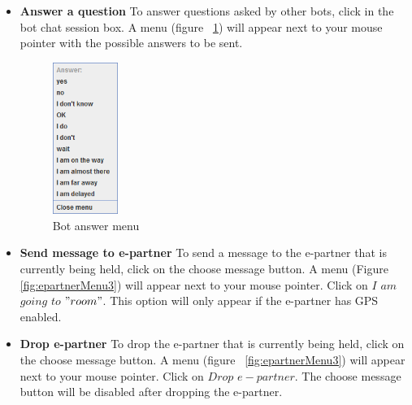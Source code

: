 \begin{itemize}
\item \textbf{Answer a question}
To answer questions asked by other bots, click in the bot chat session box. A menu (figure ~\ref{fig:answerBot}) will appear next to your mouse pointer with the possible answers to be sent.

\begin{figure}[h]
\begin{center}
\includegraphics[width=0.2\textwidth]{HumanPlayerGUI/hpg-bot-chat.png}
\end{center}
\caption{Bot answer menu}
\label{fig:answerBot}
\end{figure}

\item \textbf{Send message to e-partner}
To send a message to the e-partner that is currently being held, click on the choose message button. A menu (Figure  \ref{fig:epartnerMenu3}) will appear next to your mouse pointer. Click on $I$ $am$ $going$ $to$ $"room"$. This option will only appear if the e-partner has GPS enabled.

\item \textbf{Drop e-partner}
To drop the e-partner that is currently being held, click on the choose message button. A menu (figure  ~\ref{fig:epartnerMenu3}) will appear next to your mouse pointer. Click on $Drop$ $e-partner$. The choose message button will be disabled after dropping the e-partner.

\end{itemize}